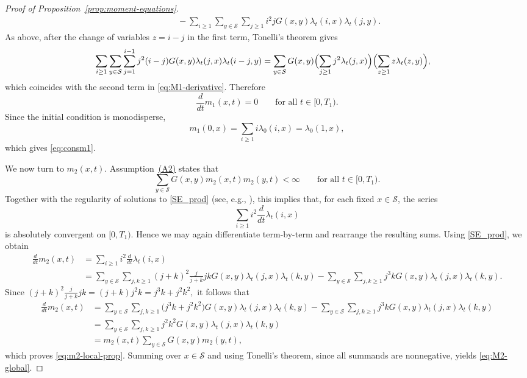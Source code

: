 \documentclass[12pt,twoside]{article}
\begin{document}
\begin{proof}[Proof of Proposition~\ref{prop:moment-equations}]
\begin{align}
&\qquad
-
\sum_{i\ge1}\sum_{y\in\mathcal S}\sum_{j\ge1}
i^2jG(x,y)\lambda_t(i,x)\lambda_t(j,y).
\label{eq:M1-derivative}
\end{align}
As above, after the change of variables $z=i-j$ in the first term,
Tonelli's theorem gives
\begin{align*}
\sum_{i\ge1}\sum_{y\in\mathcal S}\sum_{j=1}^{i-1}
j^2(i-j)G(x,y)\lambda_t(j,x)\lambda_t(i-j,y)
&=
\sum_{y\in\mathcal S} G(x,y)
\Bigl(\sum_{j\ge1} j^2\lambda_t(j,x)\Bigr)
\Bigl(\sum_{z\ge1} z\lambda_t(z,y)\Bigr),
\end{align*}
which coincides with the second term in
\eqref{eq:M1-derivative}. Therefore
$$
\frac{d}{dt}m_1(x,t)=0
\qquad\text{for all } t\in[0,T_1).
$$
Since the initial condition is monodisperse,
\begin{equation}\label{consm1}
m_1(0,x)=\sum_{i\ge1} i\lambda_0(i,x)=\lambda_0(1,x),
\end{equation}
which gives \eqref{eq:consm1}.

We now turn to $m_2(x,t)$. Assumption~\hyperlink{ass:A2}{(A2)} states that
\[
\sum_{y\in\mathcal S} G(x,y)m_2(x,t)m_2(y,t)<\infty
\qquad\text{for all } t\in[0,T_1).
\]
Together with the regularity of solutions to \eqref{SE_prod}
(see, e.g., \cite[Theorem~2.2]{norris-cluster-coag}), this implies that, for each fixed
$x\in\mathcal S$, the series
\[
\sum_{i\ge1} i^2\frac{d}{dt}\lambda_t(i,x)
\]
is absolutely convergent on $[0,T_1)$.
Hence we may again differentiate term-by-term and rearrange the resulting
sums.
 Using
\eqref{SE_prod}, we obtain
\begin{align*}
\frac{d}{dt}m_2(x,t)
&=
\sum_{i\ge1} i^2\frac{d}{dt}\lambda_t(i,x)\\
&=
\sum_{y\in\mathcal S}\sum_{j,k\ge1}
(j+k)^2\frac{j}{j+k}jkG(x,y)\lambda_t(j,x)\lambda_t(k,y)
-
\sum_{y\in\mathcal S}\sum_{j,k\ge1}
j^3kG(x,y)\lambda_t(j,x)\lambda_t(k,y).
\end{align*}
Since $(j+k)^2\frac{j}{j+k}jk=(j+k)j^2k=j^3k+j^2k^2,$ it follows that
\begin{align*}
\frac{d}{dt}m_2(x,t)
&=
\sum_{y\in\mathcal S}\sum_{j,k\ge1}
\bigl(j^3k+j^2k^2\bigr)G(x,y)\lambda_t(j,x)\lambda_t(k,y)
-
\sum_{y\in\mathcal S}\sum_{j,k\ge1}
j^3kG(x,y)\lambda_t(j,x)\lambda_t(k,y)\\
&=
\sum_{y\in\mathcal S}\sum_{j,k\ge1}
j^2k^2G(x,y)\lambda_t(j,x)\lambda_t(k,y)\\
&=
m_2(x,t)\sum_{y\in\mathcal S} G(x,y)m_2(y,t),
\end{align*}
which proves \eqref{eq:m2-local-prop}. Summing over $x\in\mathcal S$ and using Tonelli's theorem,
since all summands are nonnegative, yields \eqref{eq:M2-global}.
\end{proof}
\end{document}
